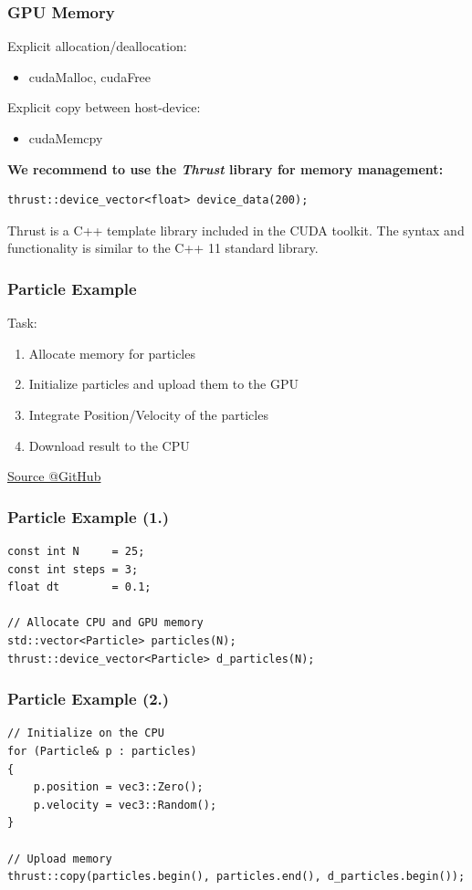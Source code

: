 \documentclass[aspectratio=169]{beamer}
\begin{document}
\begin{frame}[fragile]
	\frametitle{GPU Memory}
	Explicit allocation/deallocation:
	\begin{itemize}
		\item cudaMalloc, cudaFree
	\end{itemize}
	Explicit copy between host-device:
	\begin{itemize}
		\item cudaMemcpy
	\end{itemize}
	\textbf{We recommend to use the \textit{Thrust} library for memory management:}
\begin{lstlisting}
thrust::device_vector<float> device_data(200);
\end{lstlisting}

\begin{mdframed}[frametitle=Note:]
	Thrust is a C++ template library included in the CUDA toolkit. The syntax and functionality is similar to the C++ 11 standard library.
\end{mdframed}
	
\end{frame}


\begin{frame}[fragile]
	\frametitle{Particle Example}
	Task:
	\begin{enumerate}
		\item Allocate memory for particles
		\item Initialize particles and upload them to the GPU
		\item Integrate Position/Velocity of the particles
		\item Download result to the CPU
	\end{enumerate}
	
	\href{https://github.com/darglein/CudaTutorial/blob/master/1_Introduction/Code/simple_particle.cu}{Source @GitHub}
\end{frame}

\begin{frame}[fragile]
\frametitle{Particle Example (1.)}
\begin{lstlisting}
const int N     = 25;
const int steps = 3;
float dt        = 0.1;

// Allocate CPU and GPU memory
std::vector<Particle> particles(N);
thrust::device_vector<Particle> d_particles(N);
\end{lstlisting}
\end{frame}

\begin{frame}[fragile]
\frametitle{Particle Example (2.)}
\begin{lstlisting}
// Initialize on the CPU
for (Particle& p : particles)
{
    p.position = vec3::Zero();
    p.velocity = vec3::Random();
}

// Upload memory
thrust::copy(particles.begin(), particles.end(), d_particles.begin());
\end{lstlisting}
\end{frame}
\end{document}
